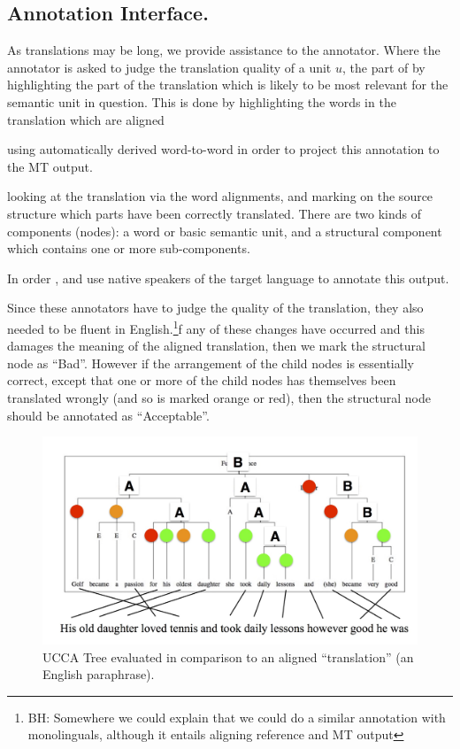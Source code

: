 \documentclass[11pt]{article}
\newcommand{\bh}[2]{\footnote{\color{blue}BH: #1}}
\begin{document}
\subsection{Annotation Interface.}

As translations may be long, we provide assistance to the annotator.
Where the annotator is asked to judge the translation quality of a unit $u$,
the part of by highlighting the part of the translation which is likely to be
most relevant for the semantic unit in question.
This is done by highlighting the words in the translation which are aligned 

using automatically derived word-to-word  in order to project
this annotation to the MT output.


looking at the translation via the word alignments, and marking
on the source structure which parts have been correctly translated.
There are two kinds of components (nodes): a word or basic semantic unit, and a structural component
which contains one or more sub-components. 

In order 
, and use native speakers of the target
language to annotate this output.


Since these annotators have to judge the quality of the translation,
they also needed to be fluent in English.\bh{Somewhere we could explain that we
could do a similar annotation with monolinguals, although it entails aligning reference and MT output}




If any of these changes have occurred and this damages the meaning of the aligned translation, then we mark the 
structural node as ``Bad''. 
However if the arrangement of the child nodes is essentially correct, except that one or
more of the child nodes has themselves been translated wrongly (and so is marked
orange or red), then the structural node should be 
annotated as ``Acceptable''.

\begin{figure}[t]
    \includegraphics[width=1\textwidth]{ucca-tree-mteval}
    \caption{UCCA Tree evaluated in comparison to an aligned ``translation'' (an
	English paraphrase).}
    \label{ucca-tree-mteval}
\end{figure}
\end{document}
